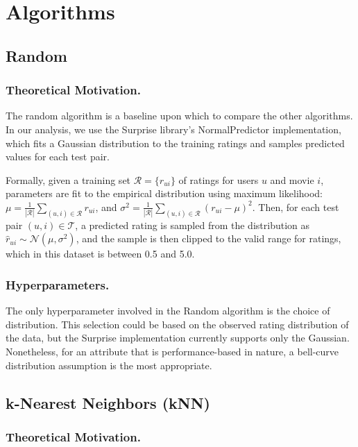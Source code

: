 \section{Algorithms}

\subsection{Random}

\subsubsection{Theoretical Motivation.}

The random algorithm is a baseline upon which to compare the other algorithms. In our analysis, we use the Surprise library's NormalPredictor
implementation, which fits a Gaussian distribution to the training ratings and samples predicted values for each test pair.

Formally, given a training set $\mathcal{R} = \{r_{ui}\}$ of ratings for users $ u $ and movie $ i $, parameters are fit to the empirical distribution 
using maximum likelihood: $ \mu = \frac{1}{|\mathcal{R}|} \sum_{(u,i) \in \mathcal{R}} r_{ui} $, and $\sigma^2 = \frac{1}{|\mathcal{R}|} \sum_{(u,i) \in \mathcal{R}} (r_{ui} - \mu)^2$. 
Then, for each test pair $(u, i) \in \mathcal{T}$, a predicted rating is sampled from the distribution as $\hat{r}_{ui} \sim \mathcal{N}(\mu, \sigma^2)$,
and the sample is then clipped to the valid range for ratings, which in this dataset is between 0.5 and 5.0.

\subsubsection{Hyperparameters.}

The only hyperparameter involved in the Random algorithm is the choice of distribution. This selection could be based on the observed
rating distribution of the data, but the Surprise implementation currently supports only the Gaussian. Nonetheless, for an attribute 
that is performance-based in nature, a bell-curve distribution assumption is the most appropriate.

\subsection{k-Nearest Neighbors (kNN)}

\subsubsection{Theoretical Motivation.}


